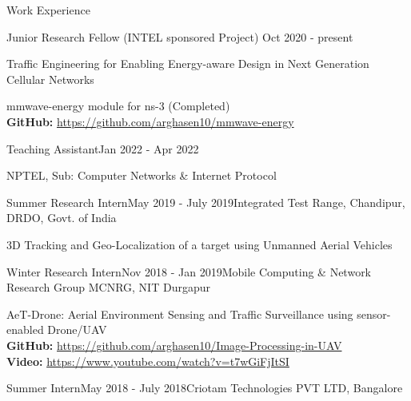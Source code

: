 \documentclass{resume} %
\begin{document}
	
	\begin{rSection}{Work Experience}
		
%			
%			
%			 
%			
		
		\begin{rSubsection}{Junior Research Fellow (INTEL sponsored Project)}  
			{Oct 2020 - present}{}{}
				\item Traffic Engineering for Enabling Energy-aware Design in Next Generation Cellular Networks
				\item mmwave-energy module for ns-3 (Completed)\\
				\textbf{GitHub:} \url{https://github.com/arghasen10/mmwave-energy}
		\end{rSubsection}
		
		\begin{rSubsection}{Teaching Assistant}{Jan 2022 - Apr 2022}{}{}
				\item NPTEL, Sub: Computer Networks \& Internet Protocol
		\end{rSubsection}
		
		
		\begin{rSubsection}{Summer Research Intern}{May 2019 - July 2019}{Integrated Test Range, Chandipur, DRDO, Govt. of India}{}{}
				\item 3D Tracking and Geo-Localization of a target using Unmanned Aerial Vehicles\\
		\end{rSubsection}
		
		\begin{rSubsection}{Winter Research Intern}{Nov 2018 - Jan 2019}{Mobile Computing \& Network Research Group MCNRG, NIT Durgapur}{}{}
				\item AeT-Drone: Aerial Environment Sensing and Traffic Surveillance using sensor-enabled Drone/UAV\\
								\textbf{GitHub:} \url{https://github.com/arghasen10/Image-Processing-in-UAV} \\
				\textbf{Video:} \url{https://www.youtube.com/watch?v=t7wGiFjItSI}
		\end{rSubsection}
		
		\begin{rSubsection}{Summer Intern}{May 2018 - July 2018}{Criotam Technologies PVT LTD, Bangalore}{}{}
		

\end{rSubsection}
\end{rSection}
\end{document}
